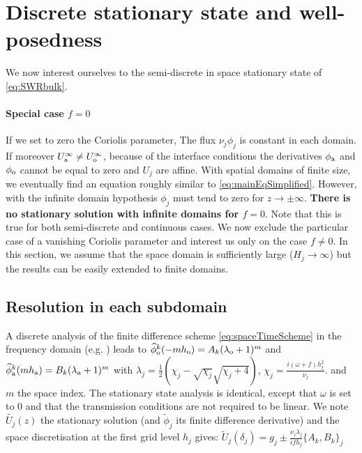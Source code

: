 \section{Discrete stationary state and well-posedness}
\label{sec:OASchwarz_DiscreteStationaryState}
We now interest ourselves to the semi-discrete in space
stationary state of \eqref{eq:SWRbulk}.
\paragraph{Special case $f=0$}
If we set to zero the Coriolis parameter,
The flux $\nu_j\phi_j$ is constant in each domain.
If moreover $U_{\rm a}^{\infty} \neq U_{\rm o}^{\infty}$,
because of the interface conditions
the derivatives $\phi_{\rm a}$ and $\phi_{\rm o}$
cannot be equal to zero and $U_j$ are affine.
With spatial domains of finite size, we eventually
find an equation roughly similar to \eqref{eq:mainEqSimplified}.
However, with the infinite domain hypothesis
$\phi_j$ must tend to zero for $z\rightarrow \pm \infty$.
\textbf{There is no stationary solution with infinite domains
for $f=0$}. Note that this is true for both semi-discrete
and continuous cases.
\newline
We now exclude the particular case of a vanishing Coriolis parameter
and interest us only on the case $f\neq 0$.
In this section, we assume that the space domain is sufficiently
large ($H_j \rightarrow \infty$) but the results can be easily
extended to finite domains.
\subsection{Resolution in each subdomain}
A discrete analysis of the finite difference scheme \eqref{eq:spaceTimeScheme} in the
frequency domain (e.g. \cite{wu_optimized_2017}) leads to 
$\widehat{\phi}_{\rm o}^k(-m h_{\rm o}) = A_k (\lambda_{\rm o}+1)^m$
and
$\widehat{\phi}_{\rm a}^k(m h_{\rm a}) = B_k (\lambda_{\rm a}+1)^m$ 
with $\lambda_j = \frac{1}{2}\left(\chi_j - \sqrt{\chi_j} \sqrt{\chi_j + 4}\right)$, 
$\chi_j=\frac{i (\omega+f) h_j^2}{\nu_j}$.
and $m$ the space index.
The stationary state analysis is identical, except that $\omega$ is set to 0 and that the transmission conditions are not required
to be linear. 
We note $\widetilde{U_j}(z)$ the stationary solution (and $\widetilde{\phi}_j$ its finite difference derivative) and the space discretisation at the first grid level $h_j$ gives:
$\widetilde{U}_j(\delta_j) = g_j \pm \frac{\nu_j\lambda_j}{if h_j} \{A_k, B_k\}_j$

